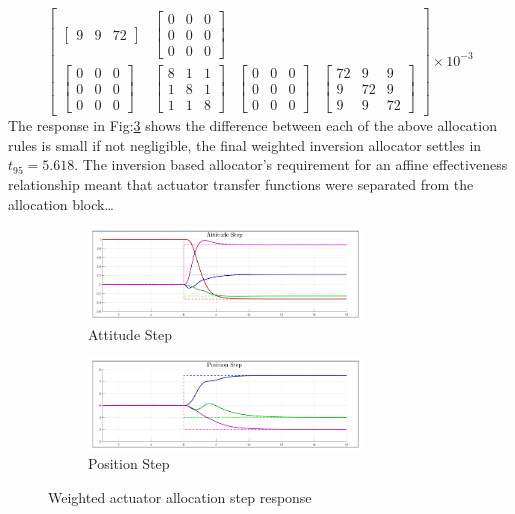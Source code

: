 \begin{equation}
\begin{bmatrix}
\begin{bmatrix}
9 & 9 & 72
\end{bmatrix}
&
\begin{bmatrix}
0 & 0 & 0\\
0 & 0 & 0\\
0 & 0 & 0
\end{bmatrix}
\\
\begin{bmatrix}
0 & 0 & 0\\
0 & 0 & 0\\
0 & 0 & 0
\end{bmatrix}
&
\begin{bmatrix}
8 & 1 & 1\\
1 & 8 & 1\\
1 & 1 & 8
\end{bmatrix}
&
\begin{bmatrix}
0 & 0 & 0\\
0 & 0 & 0\\
0 & 0 & 0
\end{bmatrix}
&
\begin{bmatrix}
72 & 9 & 9\\
9 & 72 & 9\\
9 & 9 & 72
\end{bmatrix}
\end{bmatrix}\times 10^{-3}
\end{equation}
The response in Fig:\ref{fig:weighted-inverse-step} shows the difference between each of the above allocation rules is small if not negligible, the final weighted inversion allocator settles in $t_{95}=5.618$. The inversion based allocator's requirement for an affine effectiveness relationship meant that actuator transfer functions were separated from the allocation block\ldots
\begin{figure}[hbtp]
\centering
\begin{subfigure}{\textwidth}
\centering
\includegraphics[width=0.8\textwidth]{graphs/weighted_inverse_attitude}
\caption{Attitude Step}
\label{fig:weighted_inverse_attitude}
\end{subfigure}
\begin{subfigure}{\textwidth}
\centering
\includegraphics[width=0.8\textwidth]{graphs/weighted_inverse_position}
\caption{Position Step}
\label{fig:weighted_inverse_position}
\end{subfigure}
\caption{Weighted actuator allocation step response}
\label{fig:weighted-inverse-step}
\end{figure}
